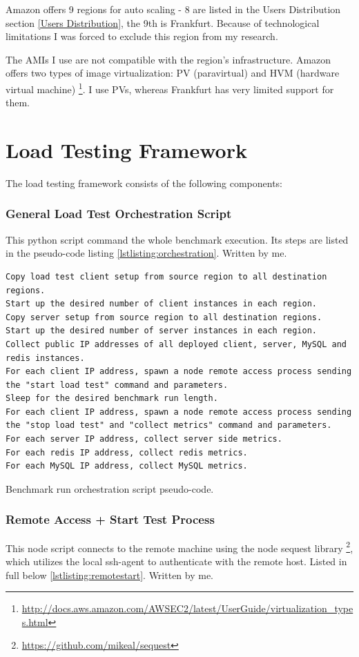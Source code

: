 \documentclass{uvamscse}
\begin{document}
Amazon offers 9 regions for auto scaling - 8 are listed in the Users Distribution section \ref{Users Distribution}, the 9th is Frankfurt. Because of technological limitations I was forced to exclude this region from my research.

The AMIs I use are not compatible with the region's infrastructure. Amazon offers two types of image virtualization: PV (paravirtual) and HVM (hardware virtual machine) \footnote{\url{http://docs.aws.amazon.com/AWSEC2/latest/UserGuide/virtualization_types.html}}. I use PVs, whereas Frankfurt has very limited support for them.

\section{Load Testing Framework}\label{Load Testing Framework}
The load testing framework consists of the following components:

\subsubsection{General Load Test Orchestration Script}
This python script command the whole benchmark execution. Its steps are listed in the pseudo-code listing \ref{lstlisting:orchestration}. Written by me.

\begin{sourcecode}[H]
\begin{lstlisting}[style=mono]
Copy load test client setup from source region to all destination regions.
Start up the desired number of client instances in each region.
Copy server setup from source region to all destination regions.
Start up the desired number of server instances in each region.
Collect public IP addresses of all deployed client, server, MySQL and redis instances.
For each client IP address, spawn a node remote access process sending
the "start load test" command and parameters.
Sleep for the desired benchmark run length.
For each client IP address, spawn a node remote access process sending
the "stop load test" and "collect metrics" command and parameters.
For each server IP address, collect server side metrics.
For each redis IP address, collect redis metrics.
For each MySQL IP address, collect MySQL metrics.
\end{lstlisting}
\caption{Benchmark run orchestration script pseudo-code.}
\label{lstlisting:orchestration}
\end{sourcecode}

\subsubsection{Remote Access + Start Test Process} This node script connects to the remote machine using the node sequest library \footnote{\url{https://github.com/mikeal/sequest}}, which utilizes the local ssh-agent to authenticate with the remote host. Listed in full below \ref{lstlisting:remotestart}. Written by me.
\end{document}
